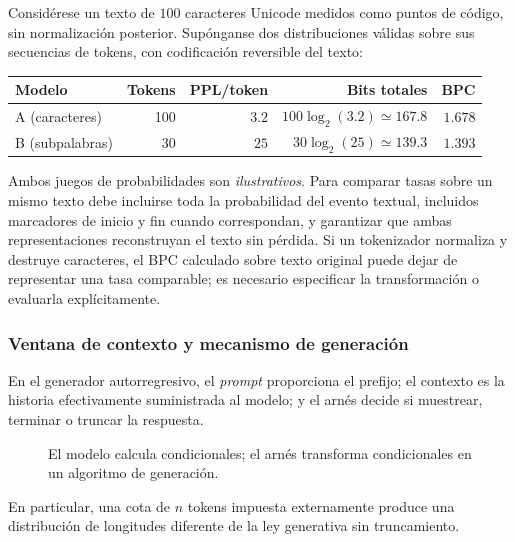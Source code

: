 Considérese un texto de $100$ caracteres Unicode medidos como puntos de
código, sin normalización posterior. Supónganse dos distribuciones válidas
sobre sus secuencias de tokens, con codificación reversible del texto:
\begin{center}
\begin{tabular}{lrrrr}\toprule
Modelo & Tokens & PPL/token & Bits totales & BPC\\\midrule
A (caracteres) &100& $3.2$ & $100\log_2(3.2)\simeq167.8$ & $1.678$\\
B (subpalabras)&30& $25$ & $30\log_2(25)\simeq139.3$ & $1.393$\\\bottomrule
\end{tabular}
\end{center}
Ambos juegos de probabilidades son \emph{ilustrativos}. Para comparar tasas
sobre un mismo texto debe incluirse toda la probabilidad del evento textual,
incluidos marcadores de inicio y fin cuando correspondan, y garantizar que
ambas representaciones reconstruyan el texto sin pérdida. Si un tokenizador
normaliza y destruye caracteres, el BPC calculado sobre texto original
puede dejar de representar una tasa comparable; es necesario especificar
la transformación o evaluarla explícitamente.

\subsubsection*{Ventana de contexto y mecanismo de generación}

En el generador autorregresivo, el \emph{prompt} proporciona el prefijo;
el contexto es la historia efectivamente suministrada al modelo;
y el arnés decide si muestrear, terminar o truncar la respuesta.
\begin{figure}[H]\centering
{}
\caption{El modelo calcula condicionales; el arnés transforma condicionales en un algoritmo de generación.}
\end{figure}
En particular, una cota de $n$ tokens impuesta externamente produce
una distribución de longitudes diferente de la ley generativa sin truncamiento.

